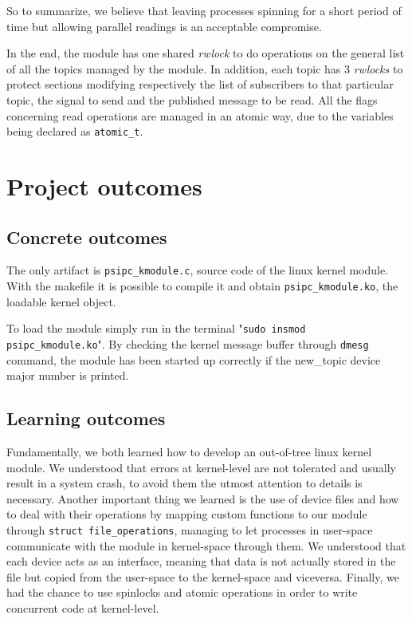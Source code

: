 \documentclass[10pt,a4]{article}
\newcommand{\code}[1]{\texttt{#1}}
\begin{document}
So to summarize, we believe that leaving processes spinning for a short period of time but allowing parallel readings is an acceptable compromise.

In the end, the module has one shared \textit{rwlock} to do operations on the general list of all the topics managed by the module. In addition, each topic has 3 \textit{rwlocks} to protect sections modifying respectively the list of subscribers to that particular topic, the signal to send and the published message to be read. All the flags concerning read operations are managed in an atomic way, due to the variables being declared as \code{atomic\_t}.


\section{Project outcomes}

\subsection{Concrete outcomes}
The only artifact is \code{psipc\_kmodule.c}, source code of the linux kernel module.
With the makefile it is possible to compile it and obtain \code{psipc\_kmodule.ko}, the loadable kernel object.

To load the module simply run in the terminal "\code{sudo insmod psipc\_kmodule.ko}". By checking the kernel message buffer through \code{dmesg} command, the module has been started up correctly if the new\_topic device major number is printed.

\subsection{Learning outcomes}

Fundamentally, we both learned how to develop an out-of-tree linux kernel module.
We understood that errors at kernel-level are not tolerated and usually result in a system crash, to avoid them the utmost attention to details is necessary.
Another important thing we learned is the use of device files and how to deal with their operations by mapping custom functions to our module through \code{struct file\_operations}, managing to let processes in user-space communicate with the module in kernel-space through them.
We understood that each device acts as an interface, meaning that data is not actually stored in the file but copied from the user-space to the kernel-space and viceversa.
Finally, we had the chance to use spinlocks and atomic operations in order to write concurrent code at kernel-level.
\end{document}
